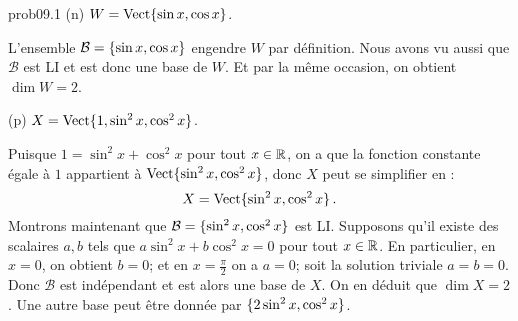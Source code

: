 \begin{sol}{prob09.1}
(n)  $ W=\sp{\sin x, \cos x}$.   

\soln L'ensemble $\mathcal B=\set{\sin x, \cos x}$ engendre $W$ par d\'efinition. Nous avons vu aussi que $\mathcal B$ est LI et est donc une base de $W$. Et par la même occasion, on obtient $\dim W=2$.   \medskip

(p) $X=\sp{1, \sin^2 x, \cos^2 x}$.   

\soln Puisque $1=\sin^2 x+ \cos^2 x $ pour tout $x\in \R$, on a que la fonction constante égale à $1$ appartient à $\sp{\sin^2 x, \cos^2 x}$, donc $X$ peut se simplifier en :
$$X=\sp{\sin^2 x, \cos^2 x}\,.$$ 
Montrons maintenant que $\mathcal B=\set{\sin^2 x, \cos^2 x}$ est LI. Supposons qu'il existe des scalaires $a,b$ tels que $a\sin^2 x + b \cos^2 x=0$ pour tout $x\in \R$. 
En particulier, en $x=0$, on obtient $b=0$; et en $x=\frac{\pi}{2}$ on a $a=0$; soit la solution triviale $a=b=0$. Donc $\mathcal B$ est indépendant et est alors une base de $X$. On en d\'eduit que $\dim X=2$. Une autre base peut \^etre donnée par $\set{2\sin^2 x, \cos^2 x}$.  \medskip



\end{sol}

